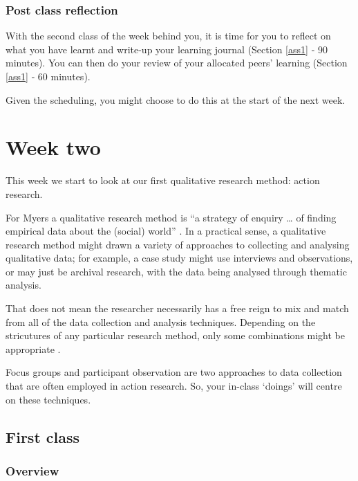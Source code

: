 \documentclass[]{book}
\theoremstyle{definition}
\theoremstyle{definition}
\theoremstyle{definition}
\theoremstyle{remark}
\begin{document}
\hypertarget{post-class-reflection-1}{%
\subsection*{Post class reflection}\label{post-class-reflection-1}}

With the second class of the week behind you, it is time for you to
reflect on what you have learnt and write-up your learning journal
(Section \ref{ass1} ‐ 90 minutes). You can then do your review of your
allocated peers' learning (Section \ref{ass1} ‐ 60 minutes).

Given the scheduling, you might choose to do this at the start of the
next week.

\hypertarget{w2-details}{%
\chapter{Week two}\label{w2-details}}

This week we start to look at our first qualitative research method:
action research.

For Myers a qualitative research method is ``a strategy of enquiry
\ldots{} of finding empirical data about the (social) world''
\autocite*[ p.~4]{myers_2013_qualitativeresearchbusiness}. In a
practical sense, a qualitative research method might drawn a variety of
approaches to collecting and analysing qualitative data; for example, a
case study might use interviews and observations, or may just be
archival research, with the data being analysed through thematic
analysis.

That does not mean the researcher necessarily has a free reign to mix
and match from all of the data collection and analysis techniques.
Depending on the stricutures of any particular research method, only
some combinations might be appropriate
\autocite{gehman_2017_findingtheorymethod}.

Focus groups and participant observation are two approaches to data
collection that are often employed in action research. So, your in-class
`doings' will centre on these techniques.

\hypertarget{first-class-1}{%
\section*{First class}\label{first-class-1}}

\hypertarget{overview-2}{%
\subsection*{Overview}\label{overview-2}}
\end{document}
